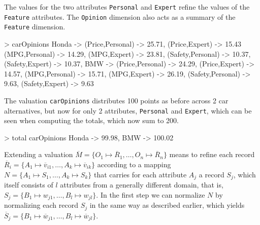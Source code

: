 \documentclass{jfp}
\newcommand{\norm}[1]{\ensuremath{\overline{#1}}}
\newcommand{\nR}{\norm{R}}
\newcommand{\nr}{\norm{r}}
\newcommand{\nv}{\norm{v}}
\newcommand{\nw}{\norm{w}}
\newcommand{\seq}[3]{\ensuremath{\overline{#3}^{#1:1..#2}}}
\newcommand{\prog}[1]{\texttt{#1}}
\begin{document}
The values for the two attributes \prog{Personal} and \prog{Expert} refine the values of the \prog{Feature} attributes. The \prog{Opinion} dimension also acts as a summary of the \prog{Feature} dimension. 

\begin{haskellcode}
> carOpinions
{Honda -> {(Price,Personal)  -> 25.71, (Price,Expert)  -> 15.43
           (MPG,Personal)    -> 14.29, (MPG,Expert)    -> 23.81,
           (Safety,Personal) -> 10.37, (Safety,Expert) -> 10.37},
 BMW ->   {(Price,Personal)  -> 24.29, (Price,Expert)  -> 14.57,
           (MPG,Personal)    -> 15.71, (MPG,Expert)    -> 26.19,
           (Safety,Personal) -> 9.63,  (Safety,Expert) -> 9.63}}
\end{haskellcode}

\noindent
%
The valuation \prog{carOpinions} distributes 100 points as before across 2 car alternatives, but now for only 2 attributes, \prog{Personal} and \prog{Expert}, which can be seen when computing the totals, which now sum to 200.

\begin{haskellcode}
> total carOpinions
{Honda -> 99.98, BMW -> 100.02}
\end{haskellcode}

\noindent
%
Extending a valuation 
%
$\norm{M} = \{O_1 \mapsto \nR_1, \ldots, O_n \mapsto \nR_n\}$
%
means to refine each record $\norm{R}_i= \{A_1 \mapsto \nv_{i1}, \ldots, A_k \mapsto \nv_{ik}\}$ according to a mapping $N = \{A_1 \mapsto S_1, \ldots, A_k \mapsto S_k\}$ that carries for each attribute $A_j$ a record $S_j$, which itself consists of $l$ attributes from a generally different domain, that is, 
%
$S_j = \{B_1 \mapsto w_{j1}, \ldots, B_l \mapsto w_{jl}\}$.
%
In the first step we can normalize $N$ by normalizing each record $S_j$ in the same way as described earlier, which yields
%
$\norm{S}_j = \{B_1 \mapsto \nw_{j1}, \ldots, B_l \mapsto \nw_{jl}\}$.
%
%
%
%
%
%
\end{document}
